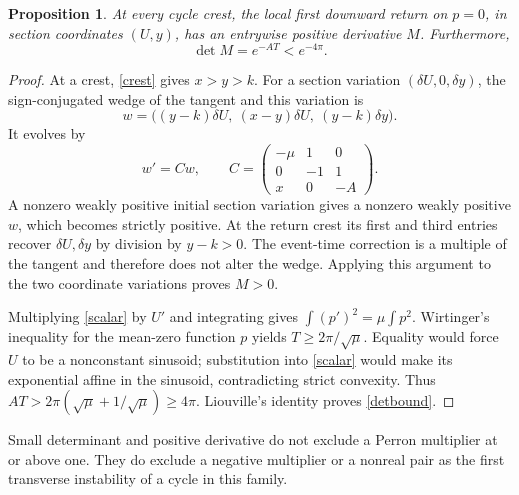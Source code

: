 \documentclass[11pt,a4paper]{article}
\newtheorem{proposition}[theorem]{Proposition}\newtheorem{corollary}[theorem]{Corollary}
\theoremstyle{remark}\newtheorem{remark}[theorem]{Remark}
\begin{document}
\begin{proposition}\label{crestmatrix}
At every cycle crest, the local first downward return on $p=0$, in section coordinates $(U,y)$, has an entrywise positive derivative $M$. Furthermore,
\begin{equation}\label{detbound}
 \det M=e^{-AT}<e^{-4\pi}.
\end{equation}
\end{proposition}
\begin{proof}
At a crest, \eqref{crest} gives $x>y>k$. For a section variation $(\delta U,0,\delta y)$, the sign-conjugated wedge of the tangent and this variation is
\[
 w=\bigl((y-k)\delta U,\ (x-y)\delta U,\ (y-k)\delta y\bigr).
\]
It evolves by
\[
 w'=Cw,\qquad C=\begin{pmatrix}-\mu&1&0\\0&-1&1\\x&0&-A\end{pmatrix}.
\]
A nonzero weakly positive initial section variation gives a nonzero weakly positive $w$, which becomes strictly positive. At the return crest its first and third entries recover $\delta U,\delta y$ by division by $y-k>0$. The event-time correction is a multiple of the tangent and therefore does not alter the wedge. Applying this argument to the two coordinate variations proves $M>0$.

Multiplying \eqref{scalar} by $U'$ and integrating gives $\int(p')^2=\mu\int p^2$. Wirtinger's inequality for the mean-zero function $p$ yields $T\ge2\pi/\sqrt\mu$. Equality would force $U$ to be a nonconstant sinusoid; substitution into \eqref{scalar} would make its exponential affine in the sinusoid, contradicting strict convexity. Thus $AT>2\pi(\sqrt\mu+1/\sqrt\mu)\ge4\pi$. Liouville's identity proves \eqref{detbound}.
\end{proof}

Small determinant and positive derivative do not exclude a Perron multiplier at or above one. They do exclude a negative multiplier or a nonreal pair as the first transverse instability of a cycle in this family.
\end{document}

